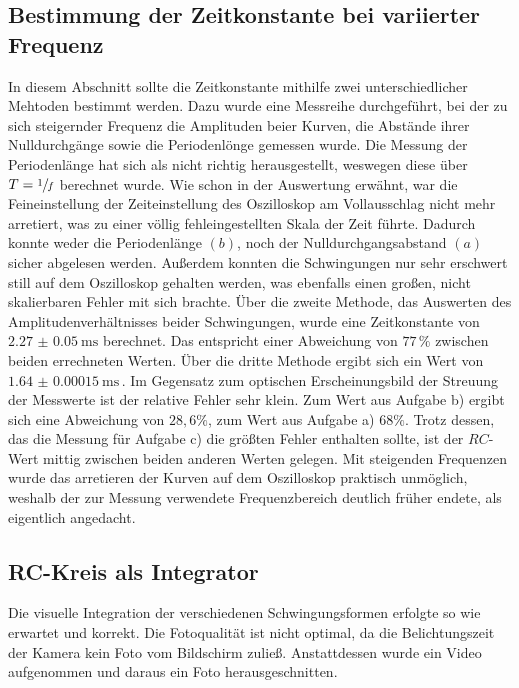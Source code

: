 \subsection{Bestimmung der Zeitkonstante bei variierter Frequenz}
In diesem Abschnitt sollte die Zeitkonstante mithilfe zwei unterschiedlicher Mehtoden bestimmt werden.
Dazu wurde eine Messreihe durchgeführt, bei der zu sich steigernder Frequenz die Amplituden beier Kurven,
die Abstände ihrer Nulldurchgänge sowie die Periodenlönge gemessen wurde. Die Messung der Periodenlänge 
hat sich als nicht richtig herausgestellt, weswegen diese über $T=\sfrac{1}{f}$ berechnet wurde.
Wie schon in der Auswertung erwähnt, war die Feineinstellung der Zeiteinstellung des Oszilloskop am 
Vollausschlag nicht mehr arretiert, was zu einer völlig fehleingestellten Skala der Zeit führte. Dadurch 
konnte weder die Periodenlänge $(b)$, noch der Nulldurchgangsabstand $(a)$ sicher abgelesen werden. 
Außerdem konnten die Schwingungen nur sehr erschwert still auf dem Oszilloskop gehalten werden, was
ebenfalls einen großen, nicht skalierbaren Fehler mit sich brachte. 
Über die zweite Methode, das Auswerten des Amplitudenverhältnisses beider Schwingungen, wurde eine 
Zeitkonstante von $\qty{2,27(0.05)}{\milli\second}$ berechnet. Das entspricht einer Abweichung von
$77\,\%$ zwischen beiden errechneten Werten. 
Über die dritte Methode ergibt sich ein Wert von $\qty{1,64(0.00015)}{\milli\second}$\,. Im Gegensatz
zum optischen Erscheinungsbild der Streuung der Messwerte ist der relative Fehler sehr klein.
Zum Wert aus Aufgabe b) ergibt sich eine Abweichung von $28,6\%$, zum Wert aus Aufgabe a)
$68\%$. Trotz dessen, das die Messung für Aufgabe c) die größten Fehler enthalten sollte,
ist der $RC$-Wert mittig zwischen beiden anderen Werten gelegen.
Mit steigenden Frequenzen wurde das arretieren der Kurven auf dem Oszilloskop praktisch unmöglich, weshalb
der zur Messung verwendete Frequenzbereich deutlich früher endete, als eigentlich angedacht.
\subsection{RC-Kreis als Integrator}
Die visuelle Integration der verschiedenen Schwingungsformen erfolgte so wie erwartet und korrekt. Die 
Fotoqualität ist nicht optimal, da die Belichtungszeit der Kamera kein Foto vom Bildschirm zuließ.
Anstattdessen wurde ein Video aufgenommen und daraus ein Foto herausgeschnitten.  